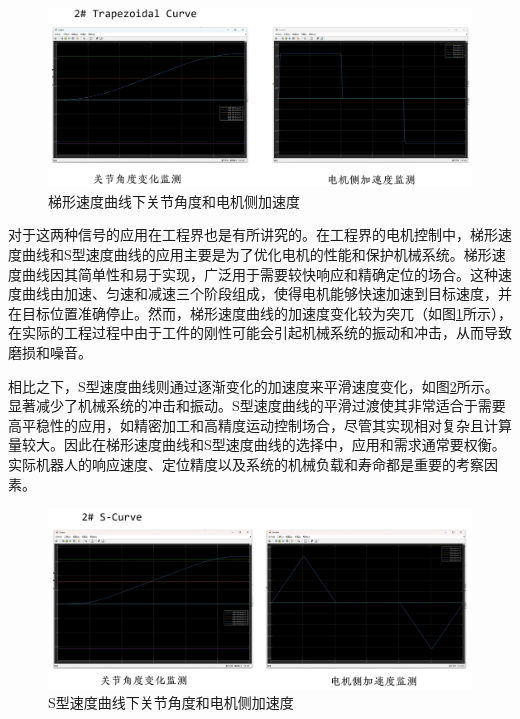 \begin{figure}[htbp]
    \centering
    \includegraphics[width=\textwidth]{Image/fig30.png}
    \caption{梯形速度曲线下关节角度和电机侧加速度}
    \label{fig:24}
\end{figure}

对于这两种信号的应用在工程界也是有所讲究的。在工程界的电机控制中，梯形速度曲线和S型速度曲线的应用主要是为了优化电机的性能和保护机械系统。梯形速度曲线因其简单性和易于实现，广泛用于需要较快响应和精确定位的场合。这种速度曲线由加速、匀速和减速三个阶段组成，使得电机能够快速加速到目标速度，并在目标位置准确停止。然而，梯形速度曲线的加速度变化较为突兀（如图\ref{fig:24}所示），在实际的工程过程中由于工件的刚性可能会引起机械系统的振动和冲击，从而导致磨损和噪音。


相比之下，S型速度曲线则通过逐渐变化的加速度来平滑速度变化，如图\ref{fig:25}所示。显著减少了机械系统的冲击和振动。S型速度曲线的平滑过渡使其非常适合于需要高平稳性的应用，如精密加工和高精度运动控制场合，尽管其实现相对复杂且计算量较大。因此在梯形速度曲线和S型速度曲线的选择中，应用和需求通常要权衡。实际机器人的响应速度、定位精度以及系统的机械负载和寿命都是重要的考察因素。

\begin{figure}[htbp]
    \centering
    \includegraphics[width=\textwidth]{Image/fig31.png}
    \caption{S型速度曲线下关节角度和电机侧加速度}
    \label{fig:25}
\end{figure}

